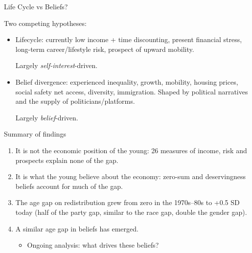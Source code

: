 \documentclass[aspectratio=169]{beamer}
\begin{document}
\begin{frame}{Life Cycle vs Beliefs?}

Two competing hypotheses: 
\begin{itemize}
    \item Lifecycle: currently low  income + time discounting, present financial stress, long-term career/lifestyle risk, prospect of upward mobility. 
    
    \vspace{0.2em}
    Largely \textit{self-interest}-driven.
    \item Belief divergence: experienced inequality, growth, mobility, housing prices, social safety net access, diversity, immigration. Shaped by political narratives and the supply of politicians/platforms.

    \vspace{0.2em}
    Largely \textit{belief}-driven.
\end{itemize}
    
\end{frame}



\begin{frame}{Summary of findings}

\begin{enumerate}
    \item It is not the economic position of the young: 26 measures of income, risk and prospects explain none of the gap.
    \item It is what the young believe about the economy: zero-sum and deservingness beliefs account for much of the gap.
    \item The age gap on redistribution grew from zero in the 1970s–80s to +0.5 SD today (half of the party gap, similar to the race gap, double the gender gap).
    \item A similar age gap in beliefs has emerged. 
    \begin{itemize}
        \item Ongoing analysis: what drives these beliefs?
    \end{itemize}
\end{enumerate}
\end{frame}
\end{document}
